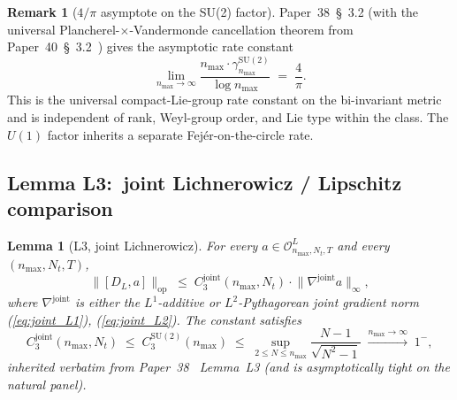 \documentclass[11pt,a4paper]{article}
\theoremstyle{plain}
\newtheorem{lemma}[theorem]{Lemma}
\theoremstyle{definition}
\newtheorem{remark}[theorem]{Remark}
\newcommand{\nmax}{n_{\max}}
\newcommand{\Nt}{N_{t}}
\newcommand{\Op}{\mathcal{O}}
\newcommand{\opnorm}[1]{\lVert #1 \rVert_{\mathrm{op}}}
\newcommand{\norm}[1]{\lVert #1 \rVert}
\newcommand{\SU}{\mathrm{SU}}
\newcommand{\Uone}{U(1)}
\newcommand{\DL}{D_{L}}
\newcommand{\gammaSU}{\gamma^{\SU(2)}}
\newcommand{\Cthreejoint}{C_{3}^{\mathrm{joint}}}
\newcommand{\CthreeSU}{C_{3}^{\SU(2)}}
\begin{document}
\begin{remark}[$4/\pi$ asymptote on the SU(2) factor]\label{rem:4_pi}
Paper~38~\S~3.2 (with the universal Plancherel-$\times$-Vandermonde
cancellation theorem from Paper~40~\S~3.2~\cite{paper40_unified}) gives
the asymptotic rate constant
\begin{equation*}
   \lim_{\nmax \to \infty} \frac{\nmax \cdot \gammaSU_{\nmax}}{\log \nmax}
   \;=\; \frac{4}{\pi}.
\end{equation*}
This is the universal compact-Lie-group rate constant on the bi-invariant
metric and is independent of rank, Weyl-group order, and Lie type
within the class. The $\Uone$ factor inherits a separate
Fej\'er-on-the-circle rate.
\end{remark}

\subsection{Lemma L3:\ joint Lichnerowicz / Lipschitz comparison}
\label{sec:L3}

\begin{lemma}[L3, joint Lichnerowicz]\label{lem:L3}
For every $a \in \Op^{L}_{\nmax,\Nt,T}$ and every $(\nmax, \Nt, T)$,
\begin{equation}\label{eq:L3_main}
   \opnorm{[\DL, a]}
   \;\le\; \Cthreejoint(\nmax, \Nt) \cdot \norm{\nabla^{\mathrm{joint}} a}_{\infty},
\end{equation}
where $\nabla^{\mathrm{joint}}$ is either the $L^{1}$-additive or
$L^{2}$-Pythagorean joint gradient norm (\ref{eq:joint_L1}),
(\ref{eq:joint_L2}). The constant satisfies
\begin{equation}\label{eq:C3_joint_bound}
   \Cthreejoint(\nmax, \Nt)
   \;\le\; \CthreeSU(\nmax)
   \;\le\; \sup_{2 \le N \le \nmax} \frac{N - 1}{\sqrt{N^{2} - 1}}
   \;\xrightarrow{\nmax \to \infty}\; 1^{-},
\end{equation}
inherited verbatim from Paper~38~\cite{paper38} Lemma~L3 (and is
asymptotically tight on the natural panel).
\end{lemma}
\end{document}
